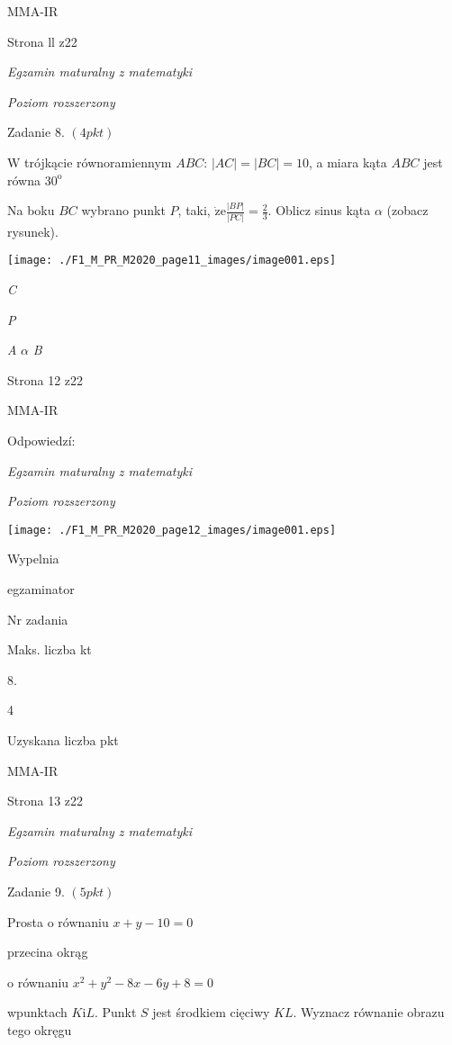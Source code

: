 \documentclass[a4paper,12pt]{article}
\begin{document}
MMA-IR

Strona ll z22





{\it Egzamin maturalny z matematyki}

{\it Poziom rozszerzony}

Zadanie 8. $(4pkt)$

$\mathrm{W}$ trójkącie równoramiennym $ABC$: $|AC|=|BC|=10$, a miara kąta $ABC$ jest równa $30^{\mathrm{o}}$

Na boku $BC$ wybrano punkt $P$, taki, $\dot{\mathrm{z}}\mathrm{e} \displaystyle \frac{|BP|}{|PC|}=\frac{2}{3}$. Oblicz sinus kąta $\alpha$ (zobacz rysunek).
\begin{center}
\texttt{[image: ./F1\_M\_PR\_M2020\_page11\_images/image001.eps]}
\end{center}
{\it C}

{\it P}

{\it A}  $\alpha$  {\it B}

Strona 12 z22

MMA-IR





Odpowiedzí:

{\it Egzamin maturalny z matematyki}

{\it Poziom rozszerzony}
\begin{center}
\texttt{[image: ./F1\_M\_PR\_M2020\_page12\_images/image001.eps]}
\end{center}
Wypelnia

egzaminator

Nr zadania

Maks. liczba kt

8.

4

Uzyskana liczba pkt

MMA-IR

Strona 13 z22





{\it Egzamin maturalny z matematyki}

{\it Poziom rozszerzony}

Zadanie 9. $(5pkt)$

Prosta o równaniu $x+y-10=0$

przecina okrąg

o równaniu $x^{2}+y^{2}-8x-6y+8=0$

wpunktach $K\mathrm{i}L$. Punkt $S$ jest środkiem cięciwy $KL$. Wyznacz równanie obrazu tego okręgu
\end{document}
